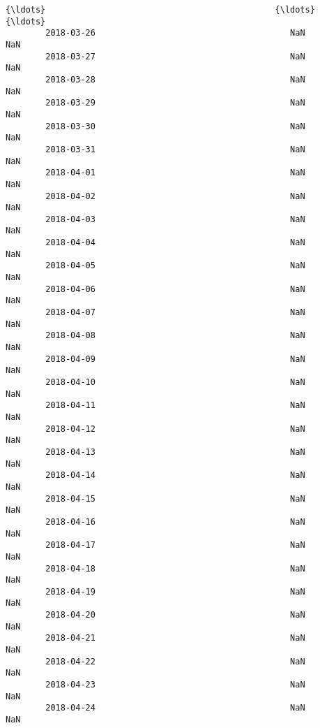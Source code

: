 \documentclass[11pt]{article}
\begin{document}
\begin{Verbatim}[commandchars=\\\{\}]
        {\ldots}                                              {\ldots}              {\ldots}   
        2018-03-26                                       NaN              NaN   
        2018-03-27                                       NaN              NaN   
        2018-03-28                                       NaN              NaN   
        2018-03-29                                       NaN              NaN   
        2018-03-30                                       NaN              NaN   
        2018-03-31                                       NaN              NaN   
        2018-04-01                                       NaN              NaN   
        2018-04-02                                       NaN              NaN   
        2018-04-03                                       NaN              NaN   
        2018-04-04                                       NaN              NaN   
        2018-04-05                                       NaN              NaN   
        2018-04-06                                       NaN              NaN   
        2018-04-07                                       NaN              NaN   
        2018-04-08                                       NaN              NaN   
        2018-04-09                                       NaN              NaN   
        2018-04-10                                       NaN              NaN   
        2018-04-11                                       NaN              NaN   
        2018-04-12                                       NaN              NaN   
        2018-04-13                                       NaN              NaN   
        2018-04-14                                       NaN              NaN   
        2018-04-15                                       NaN              NaN   
        2018-04-16                                       NaN              NaN   
        2018-04-17                                       NaN              NaN   
        2018-04-18                                       NaN              NaN   
        2018-04-19                                       NaN              NaN   
        2018-04-20                                       NaN              NaN   
        2018-04-21                                       NaN              NaN   
        2018-04-22                                       NaN              NaN   
        2018-04-23                                       NaN              NaN   
        2018-04-24                                       NaN              NaN   
        

\end{Verbatim}
\end{document}
